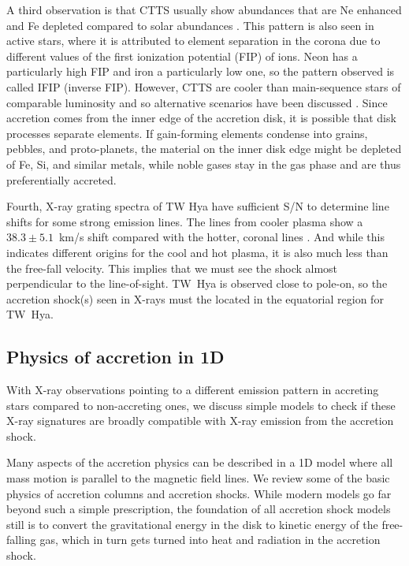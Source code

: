 A third observation is that CTTS usually show abundances that are Ne enhanced and Fe depleted compared to solar abundances \citep{Stelzer_2004}. This pattern is also seen in active stars, where it is attributed to element separation in the corona due to different values of the first ionization potential (FIP) of ions. Neon has a particularly high FIP and iron a particularly low one, so the pattern observed is called IFIP (inverse FIP). However, CTTS are cooler than main-sequence stars of comparable luminosity and so alternative scenarios have been discussed \citep{Drake_2005}. Since accretion comes from the inner edge of the accretion disk, it is possible that disk processes separate elements. If gain-forming elements condense into grains, pebbles, and proto-planets, the material on the inner disk edge might be depleted of Fe, Si, and similar metals, while noble gases stay in the gas phase and are thus preferentially accreted. 

Fourth, X-ray grating spectra of TW Hya have sufficient S/N to determine  line shifts for some strong emission lines. The lines from cooler plasma show a $38.3 \pm 5.1$~km/s shift compared with the hotter, coronal lines \cite{2017A&A...607A..14A}. And while this indicates different origins for the cool and hot plasma, it is also much less than the free-fall velocity. This implies that we must see the shock almost perpendicular to the line-of-sight. TW~Hya is observed close to pole-on, so the accretion shock(s) seen in X-rays must the located in the equatorial region for TW~Hya.




\subsection{Physics of accretion in 1D}
\label{sect:accretionphysics}
With X-ray observations pointing to a different emission pattern in accreting stars compared to non-accreting ones, we discuss simple models to check if these X-ray signatures are broadly compatible with X-ray emission from the accretion shock.

Many aspects of the accretion physics can be described in a 1D model where all mass motion is parallel to the magnetic field lines. We review some of the basic physics of accretion columns and accretion shocks. While modern models go far beyond such a simple prescription, the foundation of all accretion shock models still is to convert the gravitational energy in the disk to kinetic energy of the free-falling gas, which in turn gets turned into heat and radiation in the accretion shock.

